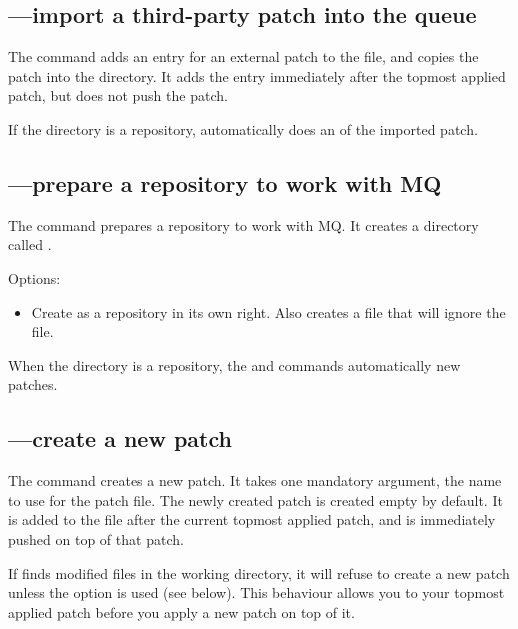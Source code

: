 \subsection{---import a third-party patch into the queue}

The  command adds an entry for an external patch to the
 file, and copies the patch into the
 directory.  It adds the entry immediately after
the topmost applied patch, but does not push the patch.

If the  directory is a repository,
 automatically does an  of the imported
patch.

\subsection{---prepare a repository to work with MQ}

The  command prepares a repository to work with MQ.  It
creates a directory called .

Options:
\begin{itemize}
\item[\hgxopt{mq}{qinit}{-c}] Create  as a repository
  in its own right.  Also creates a  file that
  will ignore the  file.
\end{itemize}

When the  directory is a repository, the
 and  commands automatically 
new patches.

\subsection{---create a new patch}

The  command creates a new patch.  It takes one mandatory
argument, the name to use for the patch file.  The newly created patch
is created empty by default.  It is added to the 
file after the current topmost applied patch, and is immediately
pushed on top of that patch.

If  finds modified files in the working directory, it will
refuse to create a new patch unless the  option is
used (see below).  This behaviour allows you to  your
topmost applied patch before you apply a new patch on top of it.

